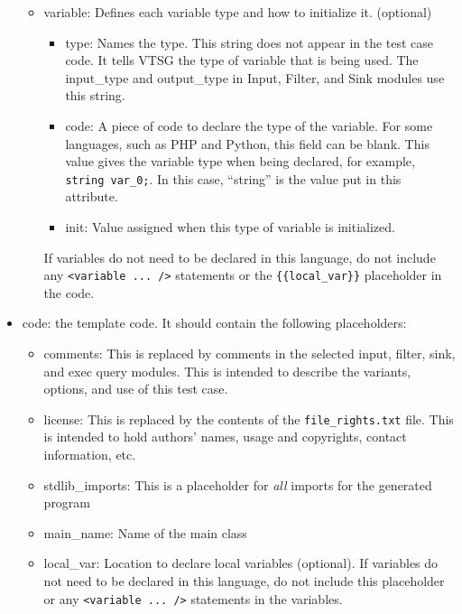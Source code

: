 \documentclass[12pt]{article}
\begin{document}
\begin{itemize}
\begin{itemize}
        \item variable: Defines each variable type and how to initialize it. (optional)
        \begin{itemize}
        \item type: Names the type. This string 
        does not appear in the test case code.  It tells VTSG
        the type of variable that is being used.  The input\_type
        and output\_type in Input, Filter, and Sink modules use
        this string.

        \item code: A piece of code to declare the type of the variable. For
        some languages, such as PHP and Python, this field can be blank. 
        This value gives the variable type when being declared, for example,
        \verb|string var_0;|.  In this case, ``string''
        is the value put in this attribute.

        \item init: Value assigned when this type of variable is initialized.
        \end{itemize}
        If variables do not need to be declared in this language, do not include
        any \verb|<variable ... />| statements or the \verb|{{local_var}}|
        placeholder in the code.
    \end{itemize}
    
    \item code: the template code. It should contain the 
    following placeholders:
    \begin{itemize}
        \item comments: This is replaced by comments in the selected input,
        filter, sink, and exec query modules.  This is intended to
        describe the variants, options, and use of this test case. 
        
        \item license: This is replaced by the contents of the
        \verb|file_rights.txt| file.  This is intended to hold
        authors' names, usage and copyrights, contact information, 
        etc.
        
        \item stdlib\_imports:  This is a placeholder for
        \emph{all} imports for the generated program

        \item main\_name:  Name of the main class

        \item local\_var: Location to declare local variables (optional).  If
          variables do not need to be declared in this language, do not include this
          placeholder or any \verb|<variable ... />| statements in the variables.


\end{itemize}
\end{itemize}
\end{document}
